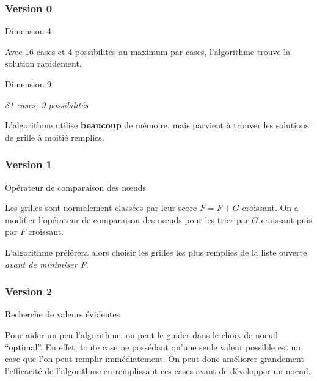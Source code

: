 
\begin{frame}
    	\frametitle{Version 0}
    
    \begin{block}{Dimension 4}
    
    Avec 16 cases et 4 possibilités au maximum par cases, l'algorithme trouve la solution rapidement.
    
    \end{block}
    
    \begin{block}{Dimension 9}
    
    \textit{81 cases, 9 possibilités}
    
    L'algorithme utilise \textbf{beaucoup} de mémoire, mais parvient à trouver les solutions de grille à moitié remplies.
    
    \end{block}
    
\end{frame}

\begin{frame}
\frametitle{Version 1}

\begin{block}{Opérateur de comparaison des nœuds}

Les grilles sont normalement classées par leur score $F=F+G$ croissant. On a modifier l'opérateur de comparaison des nœuds pour les trier par $G$ croissant puis par $F$ croissant.

L'algorithme préférera alors choisir les grilles les plus remplies de la liste ouverte \textit{avant de minimiser F}.
\end{block}


\end{frame}

\begin{frame}

\frametitle{Version 2}

\begin{block}{Recherche de valeurs évidentes}

Pour aider un peu l'algorithme, on peut le guider dans le choix de noeud ``optimal''. En effet, toute case ne possédant qu'une seule valeur possible est un case que l'on peut remplir immédiatement. On peut donc améliorer grandement l'efficacité de l'algorithme en remplissant ces cases avant de développer un noeud.

\end{block}

\end{frame}

